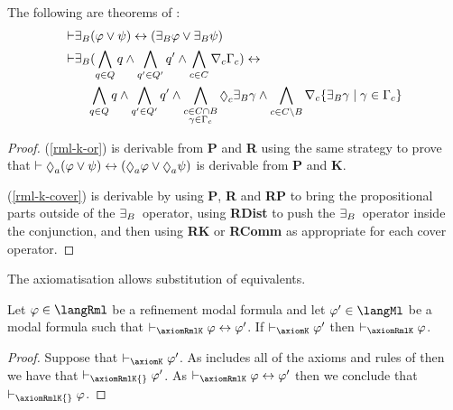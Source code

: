 \begin{lemma}\label{rml-k-theorems}
The following are theorems of \axiomRmlK{}:
\begin{align}
    \proves & \somerefsBs (\phi \lor \psi) \iff (\somerefsBs \phi \lor \somerefsBs \psi) \label{rml-k-or}\\
    \proves & \displaystyle \somerefsBs (\bigwedge_{\atomQ \in \atomsQ} \atomQ \land \bigwedge_{\atomQ' \in \atomsQ'} \atomQ' \land \bigwedge_{\agentC \in \agentsC} \coverC \Gamma_\agentC) \iff \nonumber\\
            & \displaystyle \quad
            \bigwedge_{\atomQ \in \atomsQ} \atomQ \land \bigwedge_{\atomQ' \in \atomsQ'} \atomQ' \land 
            \bigwedge_{\substack{\agentC \in \agentsC \cap \agentsB\\\gamma \in \Gamma_\agentC}} \possibleC \somerefsBs \gamma \land
            \bigwedge_{\agentC \in \agentsC \setminus \agentsB} \coversC \{\somerefsBs \gamma \mid \gamma \in \Gamma_\agentC\} \label{rml-k-cover}
\end{align}
\end{lemma}

\begin{proof}
    (\ref{rml-k-or}) is derivable from {\bf P} and {\bf R} using the same strategy to prove that $\proves \possibleA (\phi \lor \psi) \iff (\possibleA \phi \lor \possibleA \psi)$ is derivable from {\bf P} and {\bf K}.

    (\ref{rml-k-cover}) is derivable by using {\bf P}, {\bf R} and {\bf RP} to bring the propositional parts outside of the ${\exists_{B}}$~operator,
    using {\bf RDist} to push the ${\exists_{B}}$~operator inside the conjunction,
    and then using {\bf RK} or {\bf RComm} as appropriate for each cover operator.
\end{proof}

\begin{lemma}\label{rml-k-substitution-equivalents}
The axiomatisation \axiomRmlK{} allows substitution of equivalents.
\end{lemma}


\begin{lemma}\label{rml-k-ml-provability}
Let $\phi \in \langRml$ be a refinement modal formula and let $\phi' \in \langMl$ be a modal formula such that $\proves_\axiomRmlK \phi \iff \phi'$.
If $\proves_\axiomK \phi'$ then $\proves_\axiomRmlK \phi$.
\end{lemma}

\begin{proof}
Suppose that $\proves_\axiomK \phi'$.
As \axiomRmlK{} includes all of the axioms and rules of \axiomK{} then we have that $\proves_\axiomRmlK{} \phi'$.
As $\proves_\axiomRmlK \phi \iff \phi'$ then we conclude that $\proves_\axiomRmlK{} \phi$.
\end{proof}

